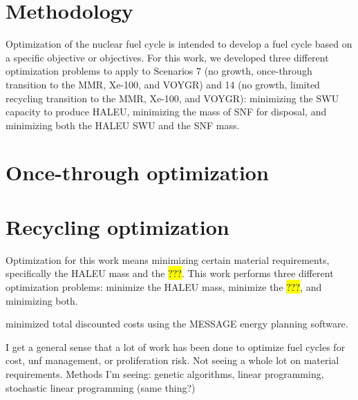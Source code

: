 \section{Methodology}
Optimization of the nuclear fuel cycle is intended to develop 
a fuel cycle based on a specific objective or objectives. For this 
work, we developed three different optimization problems to apply to 
Scenarios 7 (no growth, once-through transition to the \gls{MMR}, Xe-100, 
and VOYGR) and 14 (no growth, limited recycling transition to the 
\gls{MMR}, Xe-100, and VOYGR): minimizing the \gls{SWU} capacity to 
produce \gls{HALEU}, minimizing the mass of \gls{SNF} for disposal, 
and minimizing both the \gls{HALEU} \gls{SWU} and the \gls{SNF} 
mass. 

\section{Once-through optimization}

\section{Recycling optimization}

Optimization for this work means minimizing certain material requirements, 
specifically the \gls{HALEU} mass and the \hl{???}. This work performs three 
different optimization problems: minimize the \gls{HALEU} mass, minimize the 
\hl{???}, and minimizing both. 

\cite{andrianov_optimization_2019} minimized total discounted costs using 
the MESSAGE energy planning software. 

I get a general sense that a lot of work has been done to optimize fuel cycles 
for cost, unf management, or proliferation risk. Not seeing a whole lot on 
material requirements. 
Methods I'm seeing: genetic algorithms, linear programming, stochastic linear 
programming (same thing?)
